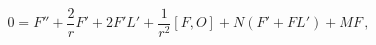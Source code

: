 \begin{equation}
0 = F'' + \frac{2}{r}F' + 2F'L'+\frac{1}{r^2}[F,O]+N(F'+FL')+MF \, ,
\end{equation}


